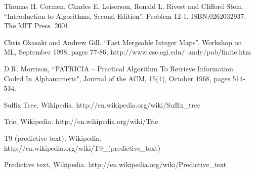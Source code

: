 \documentclass[UTF8]{article}
\begin{document}
\begin{thebibliography}{99}

Thomas H. Cormen, Charles E. Leiserson, Ronald L. Rivest and Clifford Stein.
``Introduction to Algorithms, Second Edition''. Problem 12-1. ISBN:0262032937. The MIT Press. 2001

Chris Okasaki and Andrew Gill. ``Fast Mergeable Integer
Maps''. Workshop on ML, September 1998, pages 77-86, http://www.cse.ogi.edu/~andy/pub/finite.htm

D.R. Morrison, ``PATRICIA -- Practical Algorithm To Retrieve  Information Coded In Alphanumeric", Journal of the ACM, 15(4), October 1968, pages 514-534.

Suffix Tree, Wikipedia. http://en.wikipedia.org/wiki/Suffix\_tree

Trie, Wikipedia. http://en.wikipedia.org/wiki/Trie

T9 (predictive text), Wikipedia. http://en.wikipedia.org/wiki/T9\_(predictive\_text)

Predictive text,
Wikipedia. http://en.wikipedia.org/wiki/Predictive\_text

\end{thebibliography}

\ifx\wholebook\relax\else
\end{document}
